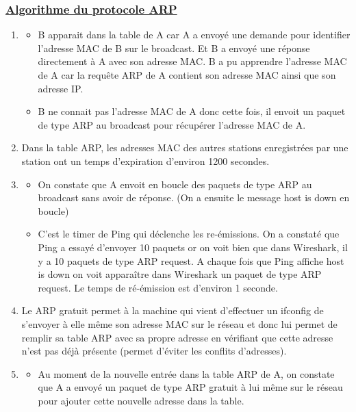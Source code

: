 \documentclass{article}
\begin{document}
\subsubsection*{\underline{Algorithme du protocole ARP}}

\begin{enumerate}[label=\arabic*)]
	\item
	\begin{itemize}\renewcommand{\labelitemi}{$\bullet$}
		\item B apparait dans la table de A car A a envoyé une demande pour identifier l'adresse MAC de B sur le broadcast. Et B a envoyé une réponse directement à A avec son adresse MAC. B a pu apprendre l'adresse MAC de A car la requête ARP de A contient son adresse MAC ainsi que son adresse IP.

		\item B ne connait pas l'adresse MAC de A donc cette fois, il envoit un paquet de type ARP au broadcast pour récupérer l'adresse MAC de A.
	\end{itemize}

	\item Dans la table ARP, les adresses MAC des autres stations enregistrées par une station ont un temps d'expiration d'environ 1200 secondes.
	
	\item
	\begin{itemize}\renewcommand{\labelitemi}{$\bullet$}
		\item On constate que A envoit en boucle des paquets de type ARP au broadcast sans avoir de réponse. (On a ensuite le message host is down en boucle)
		\item C'est le timer de Ping qui déclenche les re-émissions. On a constaté que Ping a essayé d'envoyer 10 paquets or on voit bien que dans Wireshark, il y a 10 paquets de type ARP request. A chaque fois que Ping affiche host is down on voit apparaître dans Wireshark un paquet de type ARP request. Le temps de ré-émission est d'environ 1 seconde.
	\end{itemize}
	
	\item Le ARP gratuit permet à la machine qui vient d'effectuer un ifconfig de s'envoyer à elle même son adresse MAC sur le réseau et donc lui permet de remplir sa table ARP avec sa propre adresse en vérifiant que cette adresse n'est pas déjà présente (permet d'éviter les conflits d'adresses).

	\item
	\begin{itemize}\renewcommand{\labelitemi}{$\bullet$}
		\item Au moment de la nouvelle entrée dans la table ARP de A, on constate que A a envoyé un paquet de type ARP gratuit à lui même sur le réseau pour ajouter cette nouvelle adresse dans la table.


\end{itemize}
\end{enumerate}
\end{document}
